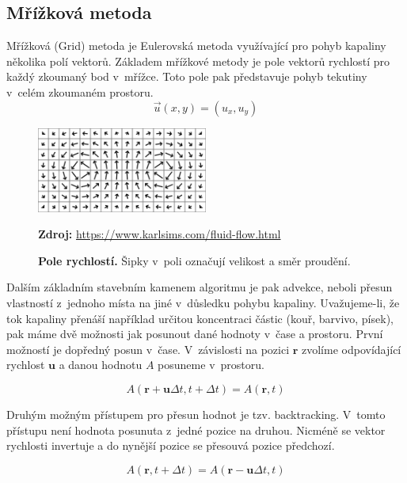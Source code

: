\subsection{Mřížková metoda}
\label{chapter:Grid}
Mřížková (Grid) metoda je Eulerovská metoda využívající pro pohyb kapaliny několika polí vektorů. Základem mřížkové metody je pole vektorů rychlostí pro každý zkoumaný bod v~mřížce. Toto pole pak představuje pohyb tekutiny v~celém zkoumaném prostoru.
\begin{equation}
    \Vec{u}(x,y) = (u_x,u_y)
\end{equation}

\begin{figure}[hbt]
	\centering
	\includegraphics[width=0.5\textwidth]{obrazky-figures/flow-field.png}
	\caption{\textbf{Pole rychlostí.} Šipky v~poli označují velikost a směr proudění.}
	\textbf{Zdroj: } \url{https://www.karlsims.com/fluid-flow.html}
	\label{fig:EulerGrid}
\end{figure}

Dalším základním stavebním kamenem algoritmu je pak advekce, neboli přesun vlastností z~jednoho místa na jiné v~důsledku pohybu kapaliny. Uvažujeme-li, že tok kapaliny přenáší například určitou koncentraci částic (kouř, barvivo, písek), pak máme dvě možnosti jak posunout dané hodnoty v~čase a prostoru.  První možností je dopředný posun v~čase. V~závislosti na pozici $\mathbf{r}$ zvolíme odpovídající rychlost $\mathbf{u}$ a danou hodnotu $A$ posuneme v~prostoru. 

\begin{equation}
     A(\mathbf{r} + \mathbf{u}\Delta t, t + \Delta t) = A(\mathbf{r}, t)
\end{equation}

Druhým možným přístupem pro přesun hodnot je tzv. backtracking. V~tomto přístupu není hodnota posunuta z~jedné pozice na druhou. Nicméně se vektor rychlosti invertuje a do nynější pozice se přesouvá pozice předchozí. \cite{webglFluid}

\begin{equation}
    A(\mathbf{r}, t + \Delta t) = A(\mathbf{r} - \mathbf{u}\Delta t, t)
\end{equation}

